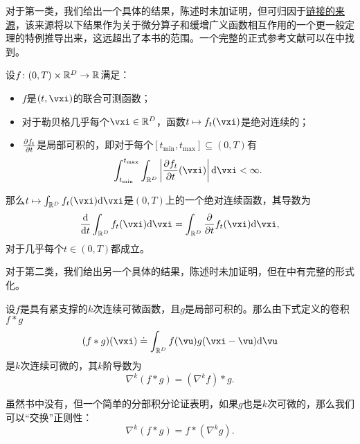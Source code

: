 \documentclass[../../book-main_zh.tex]{subfiles}
\begin{document}
对于第一类，我们给出一个具体的结果，陈述时未加证明，但可归因于\href{https://planetmath.org/differentiationundertheintegralsign}{链接的来源}，该来源将以下结果作为关于微分算子和缓增广义函数相互作用的一个更一般定理的特例推导出来，这远超出了本书的范围。一个完整的正式参考文献可以在\cite{jones1982theory}中找到。
\begin{proposition}\label{prop:dutis}
    设\(f \colon (0, T) \times \mathbb{R}^{D} \to \mathbb{R}\)满足：
    \begin{itemize}
        \item \(f\)是\((t, \vxi)\)的联合可测函数；
        \item 对于勒贝格几乎每个\(\vxi \in \R^{D}\)，函数\(t \mapsto f_{t}(\vxi)\)是绝对连续的；
        \item \(\pdv{f_{t}}{t}\)是局部可积的，即对于每个\([t_{\min}, t_{\max}] \subseteq (0, T)\)有
        \begin{equation}
            \int_{t_{\min}}^{t_{\max}}\int_{\R^{D}}\abs*{\pdv{f_{t}}{t}(\vxi)}\odif{\vxi} < \infty.
        \end{equation}
    \end{itemize}
    那么\(t \mapsto \int_{\R^{D}}f_{t}(\vxi)\odif{\vxi}\)是\((0, T)\)上的一个绝对连续函数，其导数为
    \begin{equation}
        \odv*{\int_{\R^{D}}f_{t}(\vxi)\odif{\vxi}}{t} = \int_{\R^{D}}\pdv*{f_{t}}{t}(\vxi)\odif{\vxi},
    \end{equation}
    对于几乎每个\(t \in (0, T)\)都成立。
\end{proposition}

对于第二类，我们给出另一个具体的结果，陈述时未加证明，但在\cite{brezis2011functional}中有完整的形式化。
\begin{proposition}\label{prop:diff_convolution}
    设\(f\)是具有紧支撑的\(k\)次连续可微函数，且\(g\)是局部可积的。那么由下式定义的卷积\(f * g\)
    \begin{equation}
        (f * g)(\vxi) \doteq \int_{\R^{D}}f(\vu)g(\vxi - \vu)\odif{\vu}
    \end{equation}
    是\(k\)次连续可微的，其\(k\)阶导数为
    \begin{equation}
        \nabla^{k}(f * g) =(\nabla^{k}f) * g. 
    \end{equation}
\end{proposition}
虽然书中没有，但一个简单的分部积分论证表明，如果\(g\)也是\(k\)次可微的，那么我们可以“交换”正则性：
\begin{equation}
    \nabla^{k}(f * g) = f * (\nabla^{k} g).
\end{equation}
\end{document}
